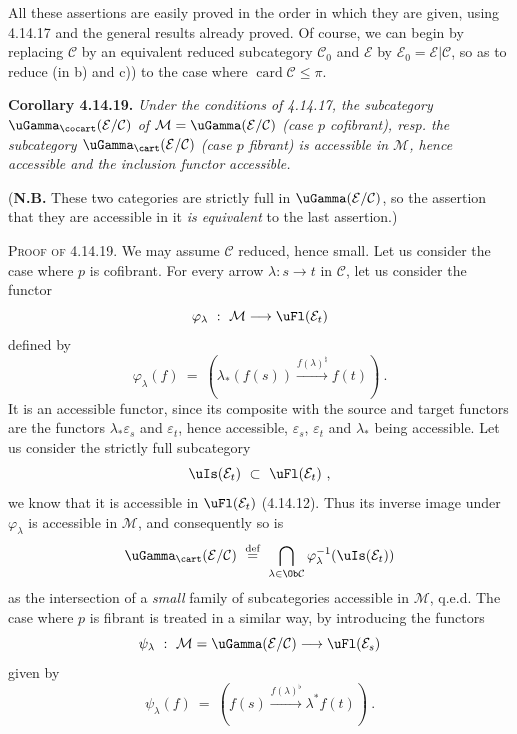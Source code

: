 
All these assertions are easily proved in the order in which they are given, using 4.14.17 and the general results already proved. Of course, we can begin by replacing $\mathcal{C}$ by an equivalent reduced subcategory $\mathcal{C}_0$ and $\mathcal{E}$ by $\mathcal{E}_0 = \mathcal{E}|\mathcal{C}$, so as to reduce (in b) and c)) to the case where $\operatorname{card}\mathcal{C} \leqslant \pi$.

\textbf{Corollary 4.14.19.} \textit{Under the conditions of 4.14.17, the subcategory $\uGamma_{\cocart}(\mathcal{E}/\mathcal{C})$ of $\mathcal{M} = \uGamma(\mathcal{E}/\mathcal{C})$ (case $p$ cofibrant), resp. the subcategory $\uGamma_{\cart}(\mathcal{E}/\mathcal{C})$ (case $p$ fibrant) is accessible in $\mathcal{M}$, hence accessible and the inclusion functor} \textit{accessible.}

(\textbf{N.B.} These two categories are strictly full in $\uGamma(\mathcal{E}/\mathcal{C})$, so the assertion that they are accessible in it \textit{is equivalent} to the last assertion.)

\textsc{Proof of} 4.14.19. We may assume $\mathcal{C}$ reduced, hence small. Let us consider the case where $p$ is cofibrant. For every arrow $\lambda : s \longrightarrow t$ in $\mathcal{C}$, let us consider the functor
\[
\varphi_\lambda \ : \ \mathcal{M} \longrightarrow \uFl(\mathcal{E}_t)
\]
defined by
\[
\varphi_\lambda(f) \ = \ (\lambda_*(f(s)) \xrightarrow{f(\lambda)^\natural} f(t)) \ .
\]
It is an accessible functor, since its composite with the source and target functors are the functors $\lambda_*\varepsilon_s$ and $\varepsilon_t$, hence accessible, $\varepsilon_s$, $\varepsilon_t$ and $\lambda_*$ being accessible. Let us consider the strictly full subcategory
\[
\uIs(\mathcal{E}_t) \ \subset \ \uFl(\mathcal{E}_t) \ ,
\]
we know that it is accessible in $\uFl(\mathcal{E}_t)$ (4.14.12). Thus its inverse image under $\varphi_\lambda$ is accessible in $\mathcal{M}$, and consequently so is
\[
\uGamma_{\cart}(\mathcal{E}/\mathcal{C}) \ \overset{\text{def}}{=} \ \bigcap_{\lambda\in\Ob\mathcal{C}} \varphi_\lambda^{-1}(\uIs(\mathcal{E}_t))
\]
as the intersection of a \textit{small} family of subcategories accessible in $\mathcal{M}$, q.e.d. The case where $p$ is fibrant is treated in a similar way, by introducing the functors
\[
\psi_\lambda \ : \ \mathcal{M} = \uGamma(\mathcal{E}/\mathcal{C}) \longrightarrow \uFl(\mathcal{E}_s)
\]
given by
\[
\psi_\lambda(f) \ = \ (f(s) \xrightarrow{f(\lambda)^\flat} \lambda^* f(t)) \ .
\]

